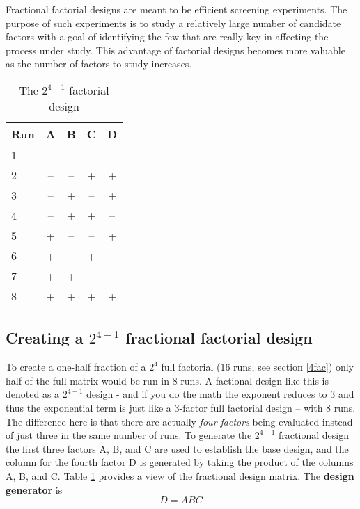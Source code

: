 Fractional factorial designs are meant to be efficient screening experiments.  The purpose of such experiments is to study a relatively large number of candidate factors with a goal of identifying the few that are really key in affecting the process under study. This advantage of factorial designs becomes more valuable as the number of factors to study increases.
\begin{table}[h]\caption{The $2^{4-1}$ factorial design}\label{tab9}
\begin{center}
\begin{tabular}{|l|c|c|c|c|}
\hline Run & A & B & C  & D  \\ 
\hline 1 & -- & -- & -- & -- \\ 
\hline 2 & -- & -- & +  & +  \\ 
\hline 3 & -- & +  & -- & +  \\ 
\hline 4 & -- & +  & +  & -- \\
\hline 5 & +  & -- & -- & +  \\
\hline 6 & +  & -- & +  & -- \\
\hline 7 & +  & +  & -- & -- \\
\hline 8 & +  & +  & +  & +  \\ 
\hline 
\end{tabular} 
\end{center}
\end{table}

\subsection{Creating a $2^{4-1}$ fractional factorial design}\label{createfrac}
To create a one-half fraction of a $2^{4}$ full factorial (16 runs, see section \ref{4fac}) only half of the full matrix would be run in 8 runs.  A factional design like this is denoted as a $2^{4-1}$ design - and if you do the math the exponent reduces to 3 and thus the exponential term is just like a 3-factor full factorial design -- with 8 runs.  The difference here is that there are actually \textit{four factors} being evaluated instead of just three in the same number of runs. To generate the $2^{4-1}$ fractional design the first three factors A, B, and C are used to establish the base design, and the column for the fourth factor D is generated by taking the product of the columns A, B, and C. Table \ref{tab9} provides a view of the fractional design matrix. The \textbf{design generator} is
\begin{equation}\label{desgen}
D = ABC
\end{equation}

